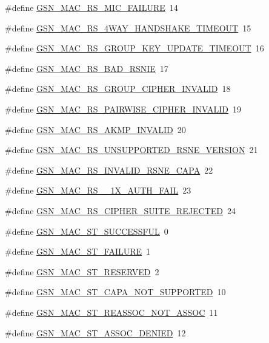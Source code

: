 \begin{DoxyCompactItemize}
\#define \hyperlink{a00523_a4018559db6af90ce22bafc7a2473fa7e}{GSN\_\-MAC\_\-RS\_\-MIC\_\-FAILURE}~14
\item 
\#define \hyperlink{a00523_ab943d1d15bd6dd2c5973e17eb58b87ab}{GSN\_\-MAC\_\-RS\_\-4WAY\_\-HANDSHAKE\_\-TIMEOUT}~15
\item 
\#define \hyperlink{a00523_afa382d0add15c833c0d2bd8698d29817}{GSN\_\-MAC\_\-RS\_\-GROUP\_\-KEY\_\-UPDATE\_\-TIMEOUT}~16
\item 
\#define \hyperlink{a00523_a05580937127ffe2d4b3bf83cbf8bf3c7}{GSN\_\-MAC\_\-RS\_\-BAD\_\-RSNIE}~17
\item 
\#define \hyperlink{a00523_a06e8203637407951f4bf6de5d36f7c0f}{GSN\_\-MAC\_\-RS\_\-GROUP\_\-CIPHER\_\-INVALID}~18
\item 
\#define \hyperlink{a00523_a17c95193c7503cee20a5b5689049348a}{GSN\_\-MAC\_\-RS\_\-PAIRWISE\_\-CIPHER\_\-INVALID}~19
\item 
\#define \hyperlink{a00523_a0e1226dbe6ae49a90302970d1aa79af9}{GSN\_\-MAC\_\-RS\_\-AKMP\_\-INVALID}~20
\item 
\#define \hyperlink{a00523_a78d5bc2195477a78a63f2fac448d692d}{GSN\_\-MAC\_\-RS\_\-UNSUPPORTED\_\-RSNE\_\-VERSION}~21
\item 
\#define \hyperlink{a00523_aa6e5afa704ef4b48b0c2dee82a1faf2f}{GSN\_\-MAC\_\-RS\_\-INVALID\_\-RSNE\_\-CAPA}~22
\item 
\#define \hyperlink{a00523_a1cb697cbc32de0732545ba6616f61df2}{GSN\_\-MAC\_\-RS\_\_\-1X\_\-AUTH\_\-FAIL}~23
\item 
\#define \hyperlink{a00523_aa8b7726a098352842267b2dcdee019b6}{GSN\_\-MAC\_\-RS\_\-CIPHER\_\-SUITE\_\-REJECTED}~24
\item 
\#define \hyperlink{a00523_ac6d49c8ed73a605810f216ff11e5ebdd}{GSN\_\-MAC\_\-ST\_\-SUCCESSFUL}~0
\item 
\#define \hyperlink{a00523_aaa6919138ed17c0a0dc951903ed24fc5}{GSN\_\-MAC\_\-ST\_\-FAILURE}~1
\item 
\#define \hyperlink{a00523_aa069082e2355b898358f470aee3faa28}{GSN\_\-MAC\_\-ST\_\-RESERVED}~2
\item 
\#define \hyperlink{a00523_a72ff1d1c2cb9a51d84ec21d6e2a47bf5}{GSN\_\-MAC\_\-ST\_\-CAPA\_\-NOT\_\-SUPPORTED}~10
\item 
\#define \hyperlink{a00523_aa8e8cb36d0c35c14f6d3aab8014c4385}{GSN\_\-MAC\_\-ST\_\-REASSOC\_\-NOT\_\-ASSOC}~11
\item 
\#define \hyperlink{a00523_a284ee0a62db19ecd2cbde145eecd97a2}{GSN\_\-MAC\_\-ST\_\-ASSOC\_\-DENIED}~12
\item 

\end{DoxyCompactItemize}
